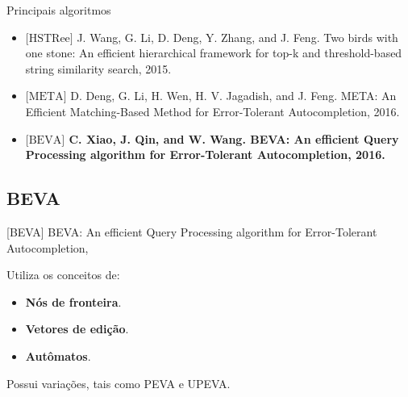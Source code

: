 \documentclass[11pt]{beamer}
\begin{document}
\begin{frame}{Principais algoritmos}
    
   \begin{itemize}
		\item $\big[ \text{HSTRee} \big]$ J. Wang, G. Li, D. Deng, Y. Zhang, and J. Feng. Two birds with one stone: An efficient hierarchical framework for top-k and threshold-based string similarity search, 2015.
		\item $\big[ \text{META} \big]$ D. Deng, G. Li, H. Wen, H. V. Jagadish, and J. Feng. META: An Efficient Matching-Based Method for Error-Tolerant Autocompletion, 2016.
        \item \textbf{$\big[ \text{BEVA} \big]$ C. Xiao, J. Qin, and W. Wang. BEVA: An efficient Query Processing algorithm for Error-Tolerant Autocompletion, 2016.}
    \end{itemize} 
    
\end{frame}

\subsection{BEVA}

\begin{frame}{[BEVA] BEVA: An efficient Query Processing algorithm for Error-Tolerant Autocompletion, \cite{BEVA}}

    \large
    Utiliza os conceitos de:
    
    \begin{itemize}
        \item \textbf{Nós de fronteira}. 
        \item \textbf{Vetores de edição}.
        \item \textbf{Autômatos}.
    \end{itemize}
    
    Possui variações, tais como PEVA e UPEVA.
    
\end{frame}
\end{document}
